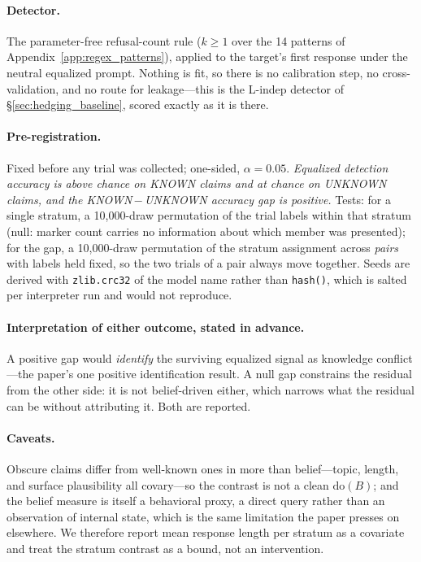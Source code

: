 \paragraph{Detector.} The parameter-free refusal-count rule ($k\!\geq\!1$ over the 14 patterns of Appendix~\ref{app:regex_patterns}), applied to the target's first response under the neutral equalized prompt. Nothing is fit, so there is no calibration step, no cross-validation, and no route for leakage---this is the L-indep detector of §\ref{sec:hedging_baseline}, scored exactly as it is there.

\paragraph{Pre-registration.} Fixed before any trial was collected; one-sided, $\alpha\!=\!0.05$. \emph{Equalized detection accuracy is above chance on KNOWN claims and at chance on UNKNOWN claims, and the KNOWN\,$-$\,UNKNOWN accuracy gap is positive.} Tests: for a single stratum, a 10{,}000-draw permutation of the trial labels within that stratum (null: marker count carries no information about which member was presented); for the gap, a 10{,}000-draw permutation of the stratum assignment across \emph{pairs} with labels held fixed, so the two trials of a pair always move together. Seeds are derived with \texttt{zlib.crc32} of the model name rather than \texttt{hash()}, which is salted per interpreter run and would not reproduce.

\paragraph{Interpretation of either outcome, stated in advance.} A positive gap would \emph{identify} the surviving equalized signal as knowledge conflict---the paper's one positive identification result. A null gap constrains the residual from the other side: it is not belief-driven either, which narrows what the residual can be without attributing it. Both are reported.

\paragraph{Caveats.} Obscure claims differ from well-known ones in more than belief---topic, length, and surface plausibility all covary---so the contrast is not a clean $\mathrm{do}(B)$; and the belief measure is itself a behavioral proxy, a direct query rather than an observation of internal state, which is the same limitation the paper presses on elsewhere. We therefore report mean response length per stratum as a covariate and treat the stratum contrast as a bound, not an intervention.

